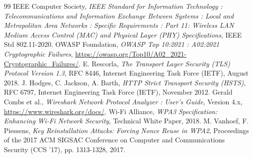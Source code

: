 \documentclass[a4paper,11pt]{article}
\begin{document}
\vspace{1em}
\begin{thebibliography}{99}
 IEEE Computer Society, \textit{IEEE Standard for Information Technology : Telecommunications and Information Exchange Between Systems : Local and Metropolitan Area Networks : Specific Requirements : Part 11: Wireless LAN Medium Access Control (MAC) and Physical Layer (PHY) Specifications}, IEEE Std 802.11-2020.
 OWASP Foundation, \textit{OWASP Top 10:2021 : A02:2021 Cryptographic Failures}, \url{https://owasp.org/Top10/A02_2021-Cryptographic_Failures/}.
 E. Rescorla, \textit{The Transport Layer Security (TLS) Protocol Version 1.3}, RFC 8446, Internet Engineering Task Force (IETF), August 2018.
 J. Hodges, C. Jackson, A. Barth, \textit{HTTP Strict Transport Security (HSTS)}, RFC 6797, Internet Engineering Task Force (IETF), November 2012.
 Gerald Combs et al., \textit{Wireshark Network Protocol Analyzer : User's Guide}, Version 4.x, \url{https://www.wireshark.org/docs/}.
 Wi-Fi Alliance, \textit{WPA3 Specification: Enhancing Wi-Fi Network Security}, Technical White Paper, 2018.
 M. Vanhoef, F. Piessens, \textit{Key Reinstallation Attacks: Forcing Nonce Reuse in WPA2}, Proceedings of the 2017 ACM SIGSAC Conference on Computer and Communications Security (CCS '17), pp. 1313-1328, 2017.
\end{thebibliography}
\end{document}
